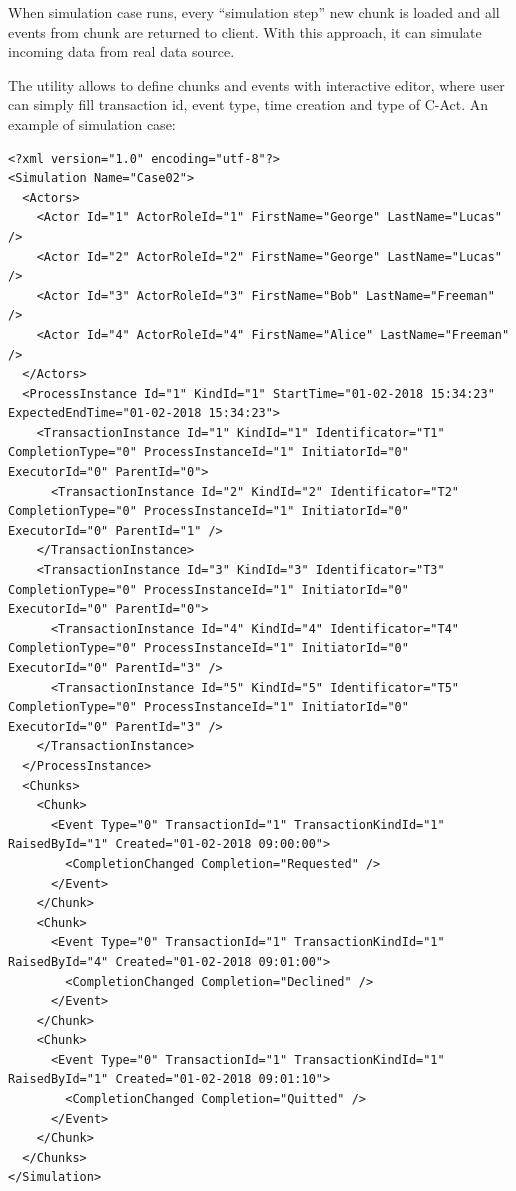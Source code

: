When simulation case runs, every ``simulation step'' new chunk is loaded and all events from chunk are returned to client. With this approach, it can simulate incoming data from real data source.

The utility allows to define chunks and events with interactive editor, where user can simply fill transaction id, event type, time creation and type of C-Act. An example of simulation case:

\begin{verbatim}
<?xml version="1.0" encoding="utf-8"?>
<Simulation Name="Case02">
  <Actors>
    <Actor Id="1" ActorRoleId="1" FirstName="George" LastName="Lucas" />
    <Actor Id="2" ActorRoleId="2" FirstName="George" LastName="Lucas" />
    <Actor Id="3" ActorRoleId="3" FirstName="Bob" LastName="Freeman" />
    <Actor Id="4" ActorRoleId="4" FirstName="Alice" LastName="Freeman" />
  </Actors>
  <ProcessInstance Id="1" KindId="1" StartTime="01-02-2018 15:34:23" ExpectedEndTime="01-02-2018 15:34:23">
    <TransactionInstance Id="1" KindId="1" Identificator="T1" CompletionType="0" ProcessInstanceId="1" InitiatorId="0" ExecutorId="0" ParentId="0">
      <TransactionInstance Id="2" KindId="2" Identificator="T2" CompletionType="0" ProcessInstanceId="1" InitiatorId="0" ExecutorId="0" ParentId="1" />
    </TransactionInstance>
    <TransactionInstance Id="3" KindId="3" Identificator="T3" CompletionType="0" ProcessInstanceId="1" InitiatorId="0" ExecutorId="0" ParentId="0">
      <TransactionInstance Id="4" KindId="4" Identificator="T4" CompletionType="0" ProcessInstanceId="1" InitiatorId="0" ExecutorId="0" ParentId="3" />
      <TransactionInstance Id="5" KindId="5" Identificator="T5" CompletionType="0" ProcessInstanceId="1" InitiatorId="0" ExecutorId="0" ParentId="3" />
    </TransactionInstance>
  </ProcessInstance>
  <Chunks>
    <Chunk>
      <Event Type="0" TransactionId="1" TransactionKindId="1" RaisedById="1" Created="01-02-2018 09:00:00">
        <CompletionChanged Completion="Requested" />
      </Event>
    </Chunk>
    <Chunk>
      <Event Type="0" TransactionId="1" TransactionKindId="1"  RaisedById="4" Created="01-02-2018 09:01:00">
        <CompletionChanged Completion="Declined" />
      </Event>
    </Chunk>
    <Chunk>
      <Event Type="0" TransactionId="1" TransactionKindId="1"  RaisedById="1" Created="01-02-2018 09:01:10">
        <CompletionChanged Completion="Quitted" />
      </Event>
    </Chunk>
  </Chunks>
</Simulation>
\end{verbatim}
